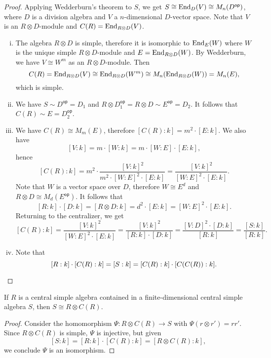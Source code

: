 \begin{proof}
Applying Wedderburn's theorem to $S$, we get
$S \cong \operatorname{End}_D(V) \cong M_n(D^{\mathsf{op}})$, where $D$ is a
division algebra and $V$ a $n$-dimensional $D$-vector space. Note
that $V$ is an $R \otimes D$-module and
$C(R) = \operatorname{End}_{R \otimes D}(V)$.

\begin{enumerate}[i)]
\item The algebra $R \otimes D$ is simple, therefore it is
isomorphic to $\operatorname{End}_E(W)$ where $W$ is the unique simple
$R \otimes D$-module and $E = \operatorname{End}_{R \otimes D}(W)$. By
Wedderburn, we have $V \cong W^m$ as an $R \otimes D$-module. Then
\[
C(R) =
\operatorname{End}_{R \otimes D}(V) \cong
\operatorname{End}_{R \otimes D}(W^m) \cong
M_n(\operatorname{End}_{R \otimes D}(W)) =
M_n(E),
\]
which is simple.
\item We have $S \sim D^{\mathsf{op}} = D_1$ and
$R \otimes D_1^{\mathsf{op}} =
R \otimes D \sim E^{\mathsf{op}} = D_2$. It follows that
$C(R) \sim E = D_2^{\mathsf{op}}$.
\item We have $C(R) \cong M_m(E)$, therefore
$[C(R) : k] = m^2 \cdot [E : k]$. We also have
\[
[V : k] = m \cdot [W : k] = m \cdot [W : E] \cdot [E : k],
\]
hence
\[
[C(R) : k] =
m^2 \cdot \frac{[V : k]^2}{m^2 \cdot [W : E]^2 \cdot [E : k]} =
\frac{[V : k]^2}{[W : E]^2 \cdot [E : k]}.
\]
Note that $W$ is a vector space over $D$, therefore $W \cong E^d$
and $R \otimes D \cong M_d(E^{\mathsf{op}})$. It follows that
\[
[R : k] \cdot [D  : k] =
[R \otimes D : k] =
d^2 \cdot [E : k] =
[W : E]^2 \cdot [E : k].
\]
Returning to the centralizer, we get
\[
[C(R) : k] =
\frac{[V : k]^2}{[W : E]^2 \cdot [E : k]} =
\frac{[V : k]^2}{[R : k] \cdot [D : k]} =
\frac{[V : D]^2 \cdot [D : k]}{[R : k]} =
\frac{[S : k]}{[R : k]}.
\]
\item Note that
\[
[R : k] \cdot [C(R) : k] =
[S : k] =
[C(R) : k] \cdot [C(C(R)) : k]. \qedhere
\]
\end{enumerate}
\end{proof}

\begin{posledica}
If $R$ is a central simple algebra contained in a
finite-dimensional central simple algebra $S$, then
$S \cong R \otimes C(R)$.
\end{posledica}

\begin{proof}
Consider the homomorphism $\Psi \colon R \otimes C(R) \to S$ with
$\Psi(r \otimes r') = rr'$. Since $R \otimes C(R)$ is simple,
$\Psi$ is injective, but given
\[
[S : k] = [R : k] \cdot [C(R) : k] = [R \otimes C(R) : k],
\]
we conclude $\Psi$ is an isomorphism.
\end{proof}

